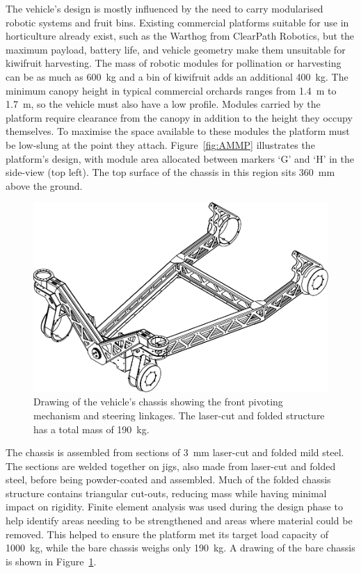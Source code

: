 \documentclass[preprint,authoryear,12pt]{elsarticle}
\begin{document}
        The vehicle's design is mostly influenced by the need to carry modularised robotic systems and fruit bins.
        Existing commercial platforms suitable for use in horticulture already exist, such as the Warthog from ClearPath Robotics, but the maximum payload, battery life, and vehicle geometry make them unsuitable for kiwifruit harvesting.
        The mass of robotic modules for pollination or harvesting can be as much as \SI{600}{\kilo\gram} and a bin of kiwifruit adds an additional \SI{400}{\kilo\gram}.
        The minimum canopy height in typical commercial orchards ranges from \SI{1.4}{\meter} to \SI{1.7}{\meter}, so the vehicle must also have a low profile.
        Modules carried by the platform require clearance from the canopy in addition to the height they occupy themselves.
        To maximise the space available to these modules the platform must be low-slung at the point they attach.
        Figure~\ref{fig:AMMP} illustrates the platform's design, with module area allocated between markers `G' and `H' in the side-view (top left).
        The top surface of the chassis in this region sits \SI{360}{\milli\meter} above the ground.

        \begin{figure}[htb]
            \centering
            \includegraphics[width=0.6\linewidth]{images/AMMP-Chassis-1-20.pdf}
            \caption{Drawing of the vehicle's chassis showing the front pivoting mechanism and steering linkages. The laser-cut and folded structure has a total mass of \SI{190}{\kilo\gram}.}
            \label{fig:AMMPChassis}
        \end{figure}

        The chassis is assembled from sections of \SI{3}{\milli\meter} laser-cut and folded mild steel.
        The sections are welded together on jigs, also made from laser-cut and folded steel, before being powder-coated and assembled.
        Much of the folded chassis structure contains triangular cut-outs, reducing mass while having minimal impact on rigidity.
        Finite element analysis was used during the design phase to help identify areas needing to be strengthened and areas where material could be removed.
        This helped to ensure the platform met its target load capacity of \SI{1000}{\kilo\gram}, while the bare chassis weighs only \SI{190}{\kilo\gram}.
        A drawing of the bare chassis is shown in Figure~\ref{fig:AMMPChassis}.
\end{document}
